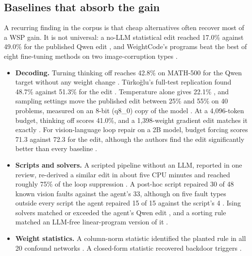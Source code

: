 \subsection{Baselines that absorb the gain}
\label{sec:baselines}

A recurring finding in the corpus is that cheap alternatives often recover most of a WSP gain. It is not universal: a no-LLM statistical edit reached 17.0\% against 49.0\% for the published Qwen edit \citep{zen24373917}, and WeightCode's programs beat the best of eight fine-tuning methods on two image-corruption types \citep{ax2611_25476}.
\begin{itemize}[leftmargin=*,itemsep=2pt]
\item \textbf{Decoding.} Turning thinking off reaches 42.8\% on MATH-500 for the Qwen target without any weight change \citep{zen24036186}. Türkoğlu's full-test replication found 48.7\% against 51.3\% for the edit \citep{turkoglu2026survey}. Temperature alone gives 22.1\% \citep{ax2611_20953}, and sampling settings move the published edit between 25\% and 55\% on 40 problems, measured on an 8-bit (q8\_0) copy of the model \citep{zen24058693}. At a 4{,}096-token budget, thinking off scores 41.0\%, and a 1{,}398-weight gradient edit matches it exactly \citep{ax2611_33133}. For vision-language loop repair on a 2B model, budget forcing scores 71.3 against 72.3 for the edit, although the authors find the edit significantly better than every baseline \citep{ax2611_25257}.
\item \textbf{Scripts and solvers.} A scripted pipeline without an LLM, reported in one review, re-derived a similar edit in about five CPU minutes and reached roughly 75\% of the loop suppression \citep{zen23954378}. A post-hoc script repaired 30 of 48 known vision faults against the agent's 33, although on five fault types outside every script the agent repaired 15 of 15 against the script's 4 \citep{ax2611_28781}. Ising solvers matched or exceeded the agent's Qwen edit \citep{ax2611_14210}, and a sorting rule matched an LLM-free linear-program version of it \citep{ax2611_21432}.
\item \textbf{Weight statistics.} A column-norm statistic identified the planted rule in all 20 confound networks \citep{ax2611_05341}. A closed-form statistic recovered backdoor triggers \citep{ax2611_19304}.

\end{itemize}
